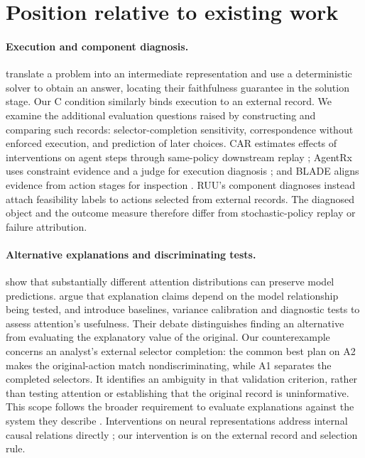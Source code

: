 \section{Position relative to existing work}
\label{sec:related}
\paragraph{Execution and component diagnosis.}
\citet{lyu2023faithful} translate a problem into an intermediate representation
and use a deterministic solver to obtain an answer, locating their faithfulness
guarantee in the solution stage. Our C condition similarly binds execution
to an external record. We examine the additional evaluation questions raised
by constructing and comparing such records: selector-completion sensitivity,
correspondence without enforced execution, and prediction of later choices.
CAR estimates effects of interventions on agent steps through same-policy
downstream replay \citep{shah2026car}; AgentRx uses constraint evidence and a
judge for execution diagnosis \citep{barke2026agentrx}; and BLADE aligns evidence
from action stages for inspection \citep{guo2026blade}. RUU's component
diagnoses instead attach feasibility labels to actions selected from
external records. The diagnosed object and the outcome measure therefore
differ from stochastic-policy replay or failure attribution.

\paragraph{Alternative explanations and discriminating tests.}
\citet{jain2019attention} show that substantially different attention
distributions can preserve model predictions. \citet{wiegreffe2019attention}
argue that explanation claims depend on the model relationship being tested,
and introduce baselines, variance calibration and diagnostic tests to assess
attention's usefulness. Their debate distinguishes finding an alternative
from evaluating the explanatory value of the original. Our counterexample
concerns an analyst's external selector completion: the common best plan
on A2 makes the original-action match nondiscriminating, while A1 separates
the completed selectors. It identifies an ambiguity in that validation
criterion, rather than testing attention or establishing that the original
record is uninformative. This scope follows the broader requirement to
evaluate explanations against the system they describe
\citep{jacovi2020faithful}. Interventions on neural representations address
internal causal relations directly \citep{geiger2021causal}; our intervention
is on the external record and selection rule.

